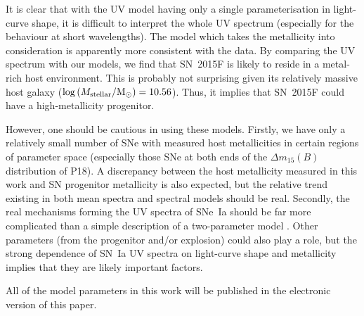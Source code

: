 \documentclass[useAMS,usenatbib]{mn2e}
\newcommand{\deltam}{\ensuremath{\Delta m_{15}}}
\begin{document}
It is clear that with the UV model having only a single parameterisation in light-curve shape, it is difficult to interpret the whole UV spectrum (especially for the behaviour at short wavelengths). The model which takes the metallicity into consideration is apparently more consistent with the data. By comparing the UV spectrum with our models, we find that SN~2015F is likely to reside in a metal-rich host environment. This is probably not surprising given its relatively massive host galaxy ($\log\,(M_{\rm stellar}/{\rm M}_{\odot})=10.56$). Thus, it implies that SN~2015F could have a high-metallicity progenitor.

However, one should be cautious in using these models. Firstly, we have only a relatively small number of SNe with measured host metallicities in certain regions of parameter space (especially those SNe at both ends of the $\deltam(B)$ distribution of P18). A discrepancy between the host metallicity measured in this work and SN progenitor metallicity is also expected, but the relative trend existing in both mean spectra and spectral models should be real. Secondly, the real mechanisms forming the UV spectra of SNe~Ia should be far more complicated than a simple description of a two-parameter model \citep[e.g.,][]{2000A&A...363..705M}. Other parameters (from the progenitor and/or explosion) could also play a role, but the strong dependence of SN~Ia UV spectra on light-curve shape and metallicity implies that they are likely important factors.

All of the model parameters in this work will be published in the electronic version of this paper.

\end{document}
